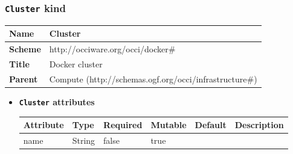 \subsubsection{\texttt{Cluster} kind}
\begin{center}
\begin{tabular}{|l|l|}
  \hline
  \textbf{Name} & Cluster \\
  \hline  
  \textbf{Scheme} & http://occiware.org/occi/docker\# \\
  \hline
  \textbf{Title} & Docker cluster \\
  \hline
  \textbf{Parent} & Compute (http://schemas.ogf.org/occi/infrastructure\#) \\
  \hline
\end{tabular}
\end{center}
\begin{itemize}
\item \textbf{\texttt{Cluster} attributes}

\begin{tabularx}{\textwidth}{|l|l|p{1.4cm}|p{1.3cm}|l|X|}
  \hline
  \textbf{Attribute} & \textbf{Type} & \textbf{Required} & \textbf{Mutable} & \textbf{Default} & \textbf{Description} \\
  \hline  
  name & String & false & true &  &  \\
  \hline
\end{tabularx}
\end{itemize}



